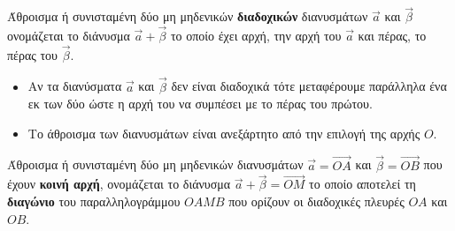 \documentclass[twoside,nofonts,internet,shmeiwseis]{thewria}
\begin{document}
\orismoi
{}
Άθροισμα ή συνισταμένη δύο μη μηδενικών \textbf{διαδοχικών}  διανυσμάτων $ \vec{a} $ και $ \vec{\beta} $ ονομάζεται το διάνυσμα $ \vec{a}+\vec{\beta} $ το οποίο έχει αρχή, την αρχή του $ \vec{a} $ και πέρας, το πέρας του $ \vec{\beta} $.
\begin{center}
\end{center}
\begin{itemize}[itemsep=0mm]
\item Αν τα διανύσματα $ \vec{a} $ και $ \vec{\beta} $ δεν είναι διαδοχικά τότε μεταφέρουμε παράλληλα ένα εκ των δύο ώστε η αρχή του να συμπέσει με το πέρας του πρώτου.
\item Το άθροισμα των διανυσμάτων είναι ανεξάρτητο από την επιλογή της αρχής $ O $.
\end{itemize}
Άθροισμα ή συνισταμένη δύο μη μηδενικών διανυσμάτων $ \vec{a}=\overrightarrow{OA} $ και $ \vec{\beta}=\overrightarrow{OB} $ που έχουν \textbf{κοινή αρχή}, ονομάζεται το διάνυσμα $ \vec{a}+\vec{\beta}=\overrightarrow{OM} $ το οποίο αποτελεί τη \textbf{διαγώνιο} του παραλληλογράμμου $ OAMB $ που ορίζουν οι διαδοχικές πλευρές $ OA $ και $ OB $.
\begin{center}
\end{center}
\end{document}
